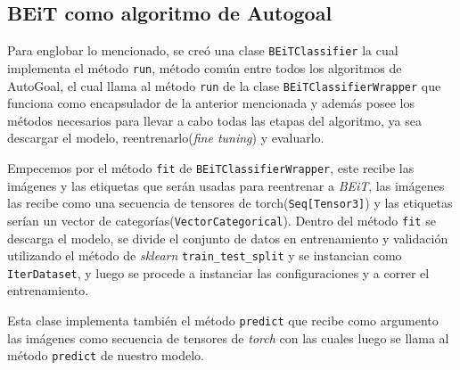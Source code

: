 \subsection{BEiT como algoritmo de Autogoal}
Para englobar lo mencionado, se creó una clase \texttt{BEiTClassifier} la cual implementa el método \texttt{run}, método común entre todos los algoritmos de AutoGoal, el cual llama al método \texttt{run} de la clase \texttt{BEiTClassifierWrapper} que funciona como encapsulador de la anterior mencionada y además posee los métodos necesarios para llevar a cabo todas las etapas del algoritmo, ya sea descargar el modelo, reentrenarlo(\textit{fine tuning}) y evaluarlo.

Empecemos por el método \texttt{fit} de \texttt{BEiTClassifierWrapper}, este recibe las imágenes y las etiquetas que serán usadas para reentrenar a \textit{BEiT}, las imágenes las recibe como una secuencia de tensores de torch(\texttt{Seq[Tensor3]}) y las etiquetas serían un vector de categorías(\texttt{VectorCategorical}). Dentro del método \texttt{fit} se descarga el modelo, se divide el conjunto de datos en entrenamiento y validación utilizando el método de \textit{sklearn} \texttt{train\_test\_split} y se instancian como \texttt{IterDataset}, y luego se procede a instanciar las configuraciones y a correr el entrenamiento.

Esta clase implementa también el método \texttt{predict} que recibe como argumento las imágenes como secuencia de tensores de \textit{torch} con las cuales luego se llama al método \texttt{predict} de nuestro modelo.